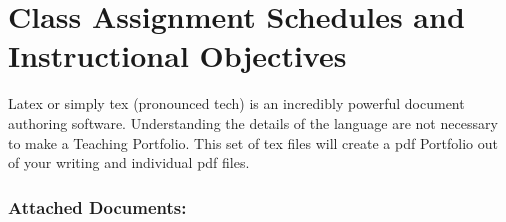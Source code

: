 \chapter[Class Assignment Schedules]{Class Assignment Schedules and\\ Instructional Objectives}\label{A}

Latex or simply tex (pronounced tech) is an incredibly powerful document authoring software. Understanding the details of the language are not necessary to make a Teaching Portfolio.  This set of tex files will create a pdf Portfolio out of your writing and individual pdf files.

\subsection*{Attached Documents:}
\begin{itemize}
\end{itemize}





